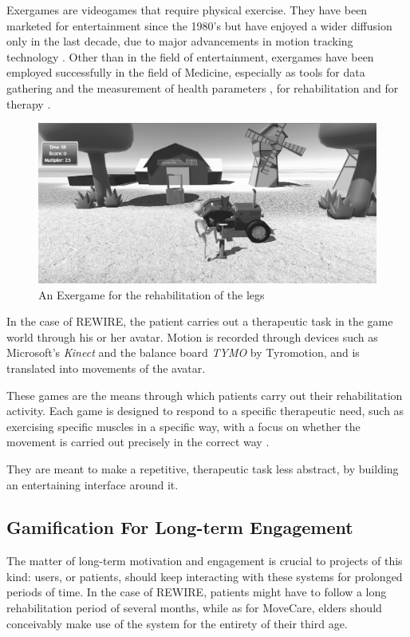 \documentclass[12pt,a4paper,oneside]{report}
\begin{document}
Exergames are videogames that require physical exercise. They have been marketed for entertainment since the 1980's but have enjoyed a wider diffusion only in the last decade, due to major advancements in motion tracking technology \cite{tanaka}. Other than in the field of entertainment, exergames have been employed successfully in the field of Medicine, especially as tools for data gathering and the measurement of health parameters \cite{exergmeasure}, for rehabilitation \cite{exergrehab} \cite{pirovano17} and for therapy \cite{exergtherapy}.

\begin{figure}[H]
\begin{center}
\caption{An Exergame for the rehabilitation of the legs}
 \label{fig:exergame}
\includegraphics[width=13cm]{pumpthewheel}
\end{center}
\end{figure}

In the case of REWIRE, the patient carries out a therapeutic task in the game world through his or her avatar. Motion is recorded through devices such as Microsoft's \textit{Kinect} and the balance board \textit{TYMO} by Tyromotion, and is translated into movements of the avatar. 

These games are the means through which patients carry out their rehabilitation activity. Each game is designed to respond to a specific therapeutic need, such as exercising specific muscles in a specific way, with a focus on whether the movement is carried out precisely in the correct way \cite{pirovano17}.

They are meant to make a repetitive, therapeutic task less abstract, by building an entertaining interface around it. 

\pagebreak

\subsection{Gamification For Long-term Engagement}
The matter of long-term motivation and engagement is crucial to projects of this kind: users, or patients, should keep interacting with these systems for prolonged periods of time. In the case of REWIRE, patients might have to follow a long rehabilitation period of several months, while as for MoveCare, elders should conceivably make use of the system for the entirety of their third age.
\end{document}

